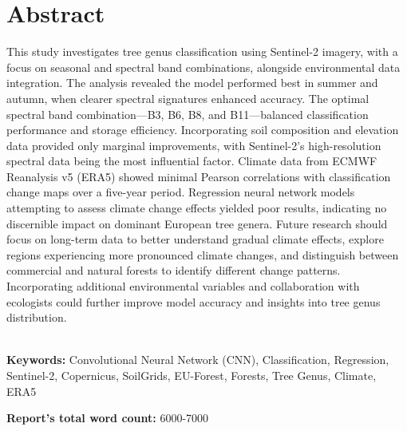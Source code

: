 \chapter*{\center \Large  Abstract}
This study investigates tree genus classification using Sentinel-2 imagery, with a focus on seasonal and spectral band combinations, alongside environmental data integration. The analysis revealed the model performed best in summer and autumn, when clearer spectral signatures enhanced accuracy. The optimal spectral band combination—B3, B6, B8, and B11—balanced classification performance and storage efficiency. Incorporating soil composition and elevation data provided only marginal improvements, with Sentinel-2’s high-resolution spectral data being the most influential factor. Climate data from ECMWF Reanalysis v5 (ERA5) showed minimal Pearson correlations with classification change maps over a five-year period. Regression neural network models attempting to assess climate change effects yielded poor results, indicating no discernible impact on dominant European tree genera. Future research should focus on long-term data to better understand gradual climate effects, explore regions experiencing more pronounced climate changes, and distinguish between commercial and natural forests to identify different change patterns. Incorporating additional environmental variables and collaboration with ecologists could further improve model accuracy and insights into tree genus distribution.

~\\[1cm]
\noindent %
\textbf{Keywords:} Convolutional Neural Network (CNN), Classification, Regression, Sentinel-2, Copernicus, SoilGrids, EU-Forest, Forests, Tree Genus, Climate, ERA5

\vfill
\noindent
\textbf{Report's total word count:} 6000-7000